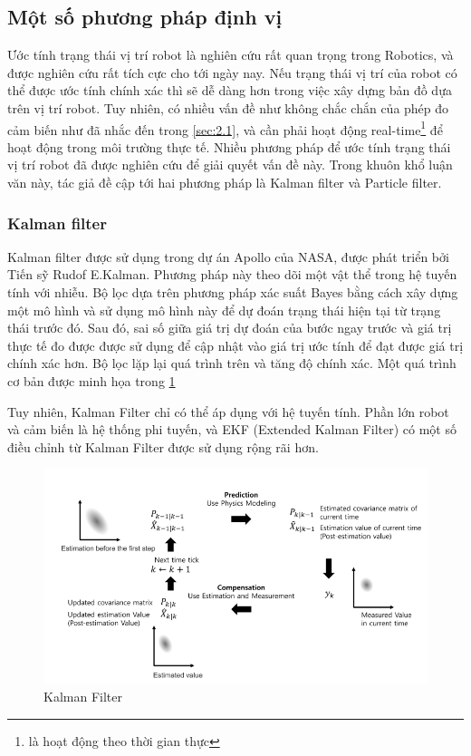 
\subsection{Một số phương pháp định vị}

Ước tính trạng thái vị trí robot là nghiên cứu rất quan trọng trong Robotics, và được nghiên cứu rất tích cực cho tới ngày nay. Nếu trạng thái vị trí của robot có thể được ước tính chính xác thì sẽ dễ dàng hơn trong việc xây dựng bản đồ dựa trên vị trí robot. Tuy nhiên, có nhiều vấn đề như không chắc chắn của phép đo cảm biến như đã nhắc đến trong \ref{sec:2.1}, và cần phải hoạt động real-time\footnote{là hoạt động theo thời gian thực} để hoạt động trong môi trường thực tế. Nhiều phương pháp để ước tính trạng thái vị trí robot đã được nghiên cứu để giải quyết vấn đề này. Trong khuôn khổ luận văn này, tác giả đề cập tới hai phương pháp là Kalman filter và Particle filter.

\subsubsection*{Kalman filter}
Kalman filter được sử dụng trong dự án Apollo của NASA, được phát triển bởi Tiến sỹ Rudof E.Kalman. Phương pháp này theo dõi một vật thể trong hệ tuyến tính với nhiễu. Bộ lọc dựa trên phương pháp xác suất Bayes bằng cách xây dựng một mô hình và sử dụng mô hình này để dự đoán trạng thái hiện tại từ trạng thái trước đó. Sau đó, sai số giữa giá trị dự đoán của bước ngay trước và giá trị thực tế đo được được sử dụng để cập nhật vào giá trị ước tính để đạt được giá trị chính xác hơn. Bộ lọc lặp lại quá trình trên và tăng độ chính xác. Một quá trình cơ bản được minh họa trong \figurename{\ref{fig:BasicConceptKalmanFilter}}

Tuy nhiên, Kalman Filter chỉ có thể áp dụng với hệ tuyến tính. Phần lớn robot và cảm biến là hệ thống phi tuyến, và EKF (Extended Kalman Filter) có một số điều chỉnh từ Kalman Filter được sử dụng rộng rãi hơn.


\begin{figure}[htbp]
  \centering
  \includegraphics[width=\linewidth]{figures/BasicConceptKalmanFilter.png}
  \caption{Kalman Filter\cite{pyo2017ros}}
  \label{fig:BasicConceptKalmanFilter}
\end{figure}

